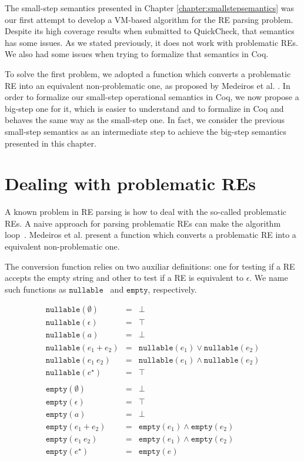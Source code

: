 \documentclass[oneside,12pt]{scrbook}
\theoremstyle{definition}
\newcommand{\nullable}{\ensuremath{\texttt{nullable}}}
\newcommand{\emptyy}{\ensuremath{\texttt{empty}}}
\theoremstyle{plain}
\theoremstyle{definition}
\begin{document}
The small-step semantics presented in Chapter \ref{chapter:smallstepsemantics} was our first attempt to develop a VM-based algorithm for the RE parsing problem. Despite its high coverage results when submitted to QuickCheck, that semantics has some issues. As we stated previously, it does not work with problematic REs. We also had some issues when trying to formalize that semantics in Coq. 

To solve the first problem, we adopted a function which converts a problematic RE into an equivalent non-problematic one, as proposed by Medeiros et al. \cite{Medeiros14}. In order to formalize our small-step operational semantics in Coq, we now propose a big-step one for it, which is easier to understand and to formalize in Coq and behaves the same way as the small-step one. In fact, we consider the previous small-step semantics as an intermediate step to achieve the big-step semantics presented in this chapter.

\section{Dealing with problematic REs}\label{section:problematic}

A known problem in RE parsing is how to deal with the so-called problematic REs. A naive approach for 
parsing problematic REs can make the algorithm loop~\cite{Frisch2004}. Medeiros et al. \cite{Medeiros14}
present a function which converts a problematic RE into a equivalent non-problematic one.

The conversion function relies on two auxiliar definitions: one for testing if a RE accepts the empty string and 
other to test if a RE is equivalent to $\epsilon$. We name such functions as \nullable~ and \emptyy, 
respectively.

\[
\begin{array}{lcl}
\nullable(\emptyset) & = & \bot \\ 
\nullable(\epsilon)  & = & \top \\
\nullable(a)         & = & \bot \\ 
\nullable(e_1 + e_2) & = & \nullable(e_1)\lor\nullable(e_2)\\
\nullable(e_1\:e_2)  & = & \nullable(e_1)\land\nullable(e_2)\\
\nullable(e ^\star)  & = & \top \\
\\
\emptyy(\emptyset)    & = & \bot \\ 
\emptyy(\epsilon)     & = & \top \\
\emptyy(a)            & = & \bot \\
\emptyy(e_1 + e_2)    & = & \emptyy(e_1) \land \emptyy(e_2)\\
\emptyy(e_1\:e_2)     & = & \emptyy(e_1) \land \emptyy(e_2)\\
\emptyy(e ^\star)     & = & \emptyy(e)\\        
\end{array}
\]
\end{document}
